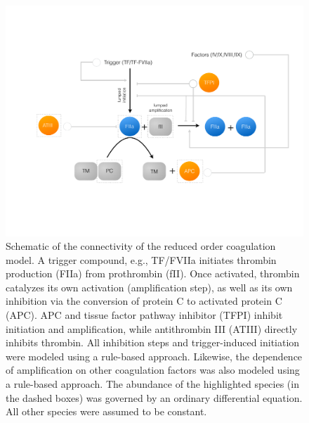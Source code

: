 \documentclass[12pt]{article}
\begin{document}
\begin{figure}
\centering
\includegraphics[width=1.0\textwidth]{./figs/Figure-1-Network.pdf}
\caption{Schematic of the connectivity of the reduced order coagulation model. A trigger compound, e.g., TF/FVIIa initiates thrombin production (FIIa) from prothrombin (fII).
Once activated, thrombin catalyzes its own activation (amplification step), as well as its own inhibition via the conversion of protein C to activated protein C (APC).
APC and tissue factor pathway inhibitor (TFPI) inhibit initiation and amplification, while antithrombin III (ATIII) directly inhibits thrombin. 
All inhibition steps and trigger-induced initiation were modeled using a rule-based approach. 
Likewise, the dependence of amplification on other coagulation factors was also modeled using a rule-based approach. 
The abundance of the highlighted species (in the dashed boxes) was governed by an ordinary differential equation. 
All other species were assumed to be constant.}\label{fig-network}
\end{figure}

\clearpage
\end{document}
